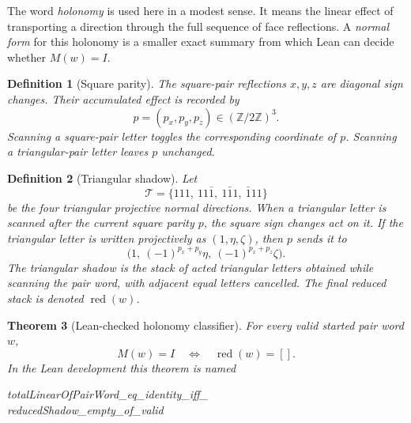 \documentclass[11pt]{article}
\newtheorem{theorem}{Theorem}
\newtheorem{definition}[theorem]{Definition}
\newcommand{\Z}{\mathbb{Z}}
\newcommand{\T}{\mathcal T}
\newcommand{\red}{\operatorname{red}}
\begin{document}
The word \emph{holonomy} is used here in a modest sense.  It means the linear
effect of transporting a direction through the full sequence of face
reflections.  A \emph{normal form} for this holonomy is a smaller exact
summary from which Lean can decide whether \(M(w)=I\).

\begin{definition}[Square parity]
The square-pair reflections \(x,y,z\) are diagonal sign changes.  Their
accumulated effect is recorded by
\[
  p=(p_x,p_y,p_z)\in(\Z/2\Z)^3.
\]
Scanning a square-pair letter toggles the corresponding coordinate of \(p\).
Scanning a triangular-pair letter leaves \(p\) unchanged.
\end{definition}

\begin{definition}[Triangular shadow]
Let
\[
  \T=\{111,\ 11\bar 1,\ 1\bar 1 1,\ \bar 1 11\}
\]
be the four triangular projective normal directions.  When a triangular
letter is scanned after the current square parity \(p\), the square sign
changes act on it.  If the triangular letter is written projectively as
\((1,\eta,\zeta)\), then \(p\) sends it to
\[
  \bigl(1,\ (-1)^{p_x+p_y}\eta,\ (-1)^{p_x+p_z}\zeta\bigr).
\]
The \emph{triangular shadow} is the stack of acted triangular letters
obtained while scanning the pair word, with adjacent equal letters cancelled.
The final reduced stack is denoted \(\red(w)\).
\end{definition}

\begin{theorem}[Lean-checked holonomy classifier]
For every valid started pair word \(w\),
\[
  M(w)=I
  \quad\Longleftrightarrow\quad
  \red(w)=[].
\]
In the Lean development this theorem is named
\begin{center}
{\small\ttfamily totalLinearOfPairWord\_eq\_identity\_iff\_}\\
{\small\ttfamily reducedShadow\_empty\_of\_valid}
\end{center}
\end{theorem}
\end{document}
